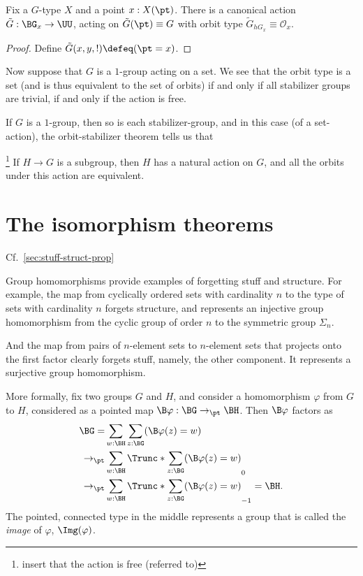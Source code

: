 \begin{theorem}
  \label{thm:orbitstab}
  Fix a $G$-type $X$ and a point $x : X(\pt)$.
  There is a canonical action $\tilde G : \BG_x \to \UU$,
  acting on $\tilde G(\pt)\equiv G$
  with orbit type $\tilde G_{hG_x} \equiv \mathcal O_x$.
\end{theorem}
\begin{proof}
  Define $\tilde G(x,y,!) \defeq (\pt = x)$.
\end{proof}

Now suppose that $G$ is a $1$-group acting on a set.
We see that the orbit type is a set
(and is thus equivalent to the set of orbits)
if and only if
all stabilizer groups are trivial,
\ie if and only if the action is free.

If $G$ is a $1$-group,
then so is each stabilizer-group,
and in this case (of a set-action),
the orbit-stabilizer theorem
tells us that

\begin{theorem}\footnote{insert that the action is free (referred to)}
\label{thm:lagrange}
  If $H \to G$ is a subgroup, then $H$ has a natural action on $G$,
  and all the orbits under this action are equivalent.
\end{theorem}


\section{The isomorphism theorems}
\label{sec:noether-theorems}

Cf.~\cref{sec:stuff-struct-prop}

Group homomorphisms provide examples of forgetting stuff and structure.
For example, the map from cyclically ordered sets with cardinality $n$
to the type of sets with cardinality $n$ forgets structure,
and represents an injective group homomorphism from the cyclic
group of order $n$ to the symmetric group $\Sigma_n$.

And the map from pairs of $n$-element sets to $n$-element sets
that projects onto the first factor clearly forgets stuff,
namely, the other component.
It represents a surjective group homomorphism.

More formally, fix two groups $G$ and $H$,
and consider a homomorphism $\varphi$ from $G$ to $H$,
considered as a pointed map $\B\varphi : \BG \to_\pt \BH$.
Then $\B\varphi$ factors as
\begin{align*}
  \BG
  = &\sum_{w:\BH}\sum_{z:\BG}(\B\varphi(z)=w)\\
  \to_\pt &\sum_{w:\BH}\Trunc*{\sum_{z:\BG}(\B\varphi(z)=w)}_0\\
  \to_\pt &\sum_{w:\BH}\Trunc*{\sum_{z:\BG}(\B\varphi(z)=w)}_{-1} = \BH.
\end{align*}
The pointed, connected type in the middle represents a group
that is called the \emph{image} of $\varphi$, $\Img(\varphi)$.


